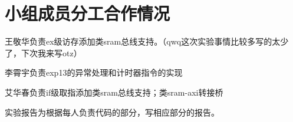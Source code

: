 \documentclass[11pt]{article}
\begin{document}
         

      
\vspace{1ex}

\section{小组成员分工合作情况}
王敬华负责ex级访存添加类sram总线支持。（qwq这次实验事情比较多写的太少了，下次我来写otz）

李霄宇负责exp13的异常处理和计时器指令的实现

艾华春负责if级取指添加类sram总线支持；类sram-axi转接桥

实验报告为根据每人负责代码的部分，写相应部分的报告。
\end{document}
